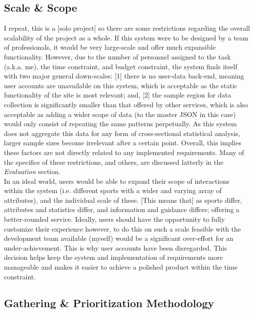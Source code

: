 \documentclass[11pt, english]{article}
\begin{document}
	\subsection{Scale \& Scope}

	I repeat, this is a [solo project] so there are some restrictions regarding the overall scalability of the project as a whole. If this system were to be designed by a team of professionals, it would be very large-scale and offer much expansible functionality. However, due to the number of personnel assigned to the task (a.k.a. me), the time constraint, and budget constraint, the system finds itself with two major general down-scales: [1] there is no user-data back-end, meaning user accounts are unavailable on this system, which is acceptable as the static functionality of the site is most relevant; and, [2] the sample region for data collection is significantly smaller than that offered by other services, which is also acceptable as adding a wider scope of data (to the master JSON in this case) would only consist of repeating the same patterns perpetually. As this system does not aggregate this data for any form of cross-sectional statistical analysis, larger sample sizes become irrelevant after a certain point. Overall, this implies these factors are not directly related to any implemented requirements. Many of the specifics of these restrictions, and others, are discussed latterly in the \textit{Evaluation} section.\\

	In an ideal world, users would be able to expand their scope of interactions within the system (i.e. different sports with a wider and varying array of attributes), and the individual scale of these. [This means that] as sports differ, attributes and statistics differ, and information and guidance differs; offering a better-rounded service. Ideally, users should have the opportunity to fully customize their experience however, to do this on such a scale feasible with the development team available (myself) would be a significant over-effort for an under-achievement. This is why user accounts have been disregarded. This decision helps keep the system and implementation of requirements more manageable and makes it easier to achieve a polished product within the time constraint. 

	\subsection{Gathering \& Prioritization Methodology}
\end{document}
